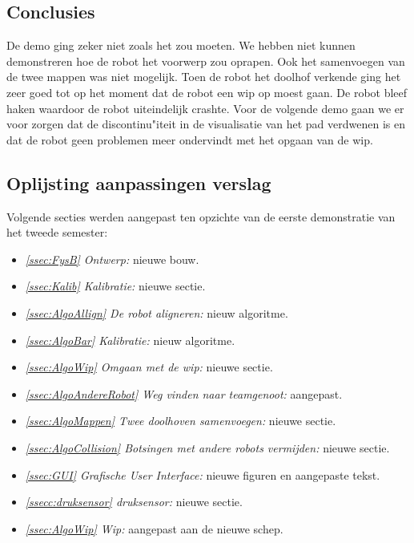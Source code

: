 \documentclass[tt3]{penoverslag}
\begin{document}
\subsection{Conclusies}
\label{Assec:conc2}
De demo ging zeker niet zoals het zou moeten. We hebben niet kunnen demonstreren hoe de robot het voorwerp zou oprapen. Ook het samenvoegen van de twee mappen was niet mogelijk. Toen de robot het doolhof verkende ging het zeer goed tot op het moment dat de robot een wip op moest gaan. De robot bleef haken waardoor de robot uiteindelijk crashte. Voor de volgende demo gaan we er voor zorgen dat de discontinu"iteit in de visualisatie van het pad verdwenen is en dat de robot geen problemen meer ondervindt met het opgaan van de wip.


\subsection{Oplijsting aanpassingen verslag}
\label{Assec:aanp2}
Volgende secties werden aangepast ten opzichte van de eerste demonstratie van het tweede semester:

\begin{itemize}
\item \textit{\ref{ssec:FysB} Ontwerp:} nieuwe bouw.
\item \textit{\ref{ssec:Kalib} Kalibratie:} nieuwe sectie.
\item \textit{\ref{ssec:AlgoAllign} De robot aligneren:} nieuw algoritme.
\item \textit{\ref{ssec:AlgoBar} Kalibratie:} nieuw algoritme.
\item \textit{\ref{ssec:AlgoWip} Omgaan met de wip:} nieuwe sectie.
\item \textit{\ref{ssec:AlgoAndereRobot} Weg vinden naar teamgenoot:} aangepast.
\item \textit{\ref{ssec:AlgoMappen} Twee doolhoven samenvoegen:} nieuwe sectie.
\item \textit{\ref{ssec:AlgoCollision} Botsingen met andere robots vermijden:} nieuwe sectie.
\item \textit{\ref{ssec:GUI} Grafische User Interface:} nieuwe figuren en aangepaste tekst.
\item \textit{\ref{ssecc:druksensor} druksensor:} nieuwe sectie.
\item \textit{\ref{ssec:AlgoWip} Wip:} aangepast aan de nieuwe schep.

\end{itemize}
\end{document}
